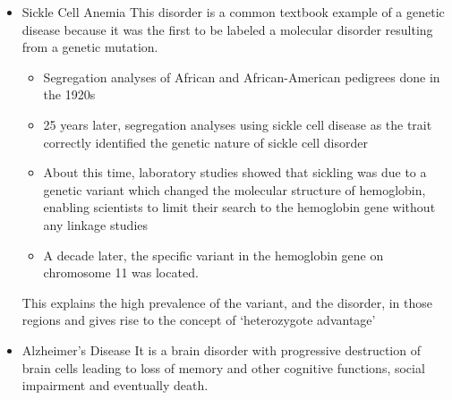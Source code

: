 \documentclass[a4paper,twoside,11pt]{article}
\begin{document}
\begin{itemize}
    \item Sickle Cell Anemia
\newline
This disorder is a common textbook example of a genetic disease because it was the first to be labeled a molecular disorder resulting from a genetic mutation.
    \begin{itemize}
        \item Segregation analyses of African and African-American pedigrees done in the 1920s
        \item 25 years later, segregation analyses using sickle cell disease as the trait correctly identified the genetic nature of sickle cell disorder
        \item About this time, laboratory studies showed that sickling was due to a genetic variant which changed the molecular structure of hemoglobin, enabling scientists to limit their search to the hemoglobin gene without any linkage studies
        \item A decade later, the specific variant in the hemoglobin gene on chromosome 11 was located.
    \end{itemize}
This explains the high prevalence of the variant, and the disorder, in those regions and gives rise to the concept of ‘heterozygote advantage’
    \item Alzheimer’s Disease
\newline
It is a brain disorder with progressive destruction of brain cells leading to loss of memory and other cognitive functions, social impairment and eventually death. 
\end{itemize}
\end{document}
